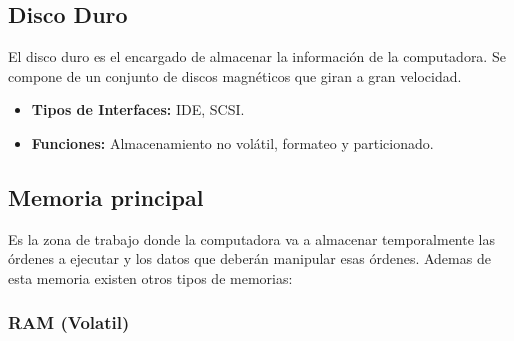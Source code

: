 \documentclass{templateNote}
\begin{document}
\subsection{Disco Duro}
\noindent El disco duro es el encargado de almacenar la información de la computadora. Se compone de un conjunto de discos magnéticos que giran a gran velocidad.
\begin{itemize}
    \item \textbf{Tipos de Interfaces:} IDE, SCSI.
    \item \textbf{Funciones:} Almacenamiento no volátil, formateo y particionado.
\end{itemize}

\subsection{Memoria principal} 
\noindent Es la zona de trabajo donde la computadora va a almacenar temporalmente las órdenes a ejecutar y los datos que deberán manipular esas órdenes. Ademas de esta memoria existen otros tipos de memorias:

\subsubsection{RAM (Volatil)}
\begin{figure}[H]
    \centering
\end{figure}
\end{document}
